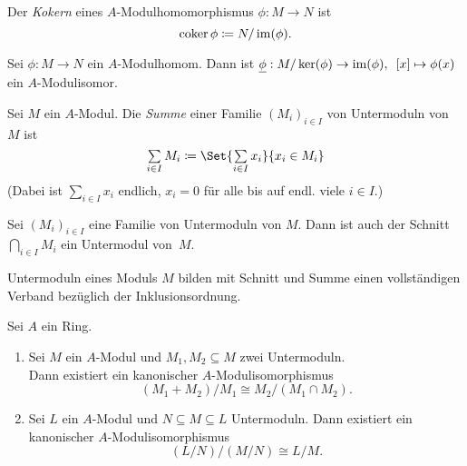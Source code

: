 \documentclass{cheat-sheet}
\DeclareMathOperator{\coker}{coker} %
\begin{document}
\begin{defn}
  Der \emph{Kokern} eines $A$-Modulhomomorphismus $\phi : M \to N$ ist
  \[
    \coker \phi \coloneqq N/\im(\phi).
  \]
\end{defn}


\begin{bem}
   \quad
  \inlineitem{$\phi$ surjektiv $\iff$ $\coker \phi = 0$}
\end{bem}

\begin{prop}
  Sei $\phi : M \to N$ ein $A$-Modulhomom.
  Dann ist $\underline{\phi} : M / \ker(\phi) \to \operatorname{im}(\phi), \enspace [x] \mapsto \phi(x)$ ein $A$-Modulisomor.
\end{prop}


\begin{defn}
  Sei $M$ ein $A$-Modul.
  Die \emph{Summe} einer Familie $(M_i)_{i \in I}$ von Untermoduln von $M$ ist
  \[
    \sum_{i \in I} M_i \coloneqq \Set{\sum_{i \in I} x_i}{x_i \in M_i}
  \]
  (Dabei ist $\sum_{i \in I} x_i$ endlich, \dh{} $x_i = 0$ für alle bis auf endl. viele $i \in I$.)
\end{defn}

\begin{prop}
  Sei $(M_i)_{i \in I}$ eine Familie von Untermoduln von $M$.
  Dann ist auch der Schnitt $\bigcap_{i \in I} M_i$ ein Untermodul von~$M$.
\end{prop}

\begin{bem}
  Untermoduln eines Moduls $M$ bilden mit Schnitt und Summe einen vollständigen Verband bezüglich der Inklusionsordnung.
\end{bem}


\begin{prop}
  Sei $A$ ein Ring.
  \begin{enumerate}
    \item Sei $M$ ein $A$-Modul und $M_1, M_2 \subseteq M$ zwei Untermoduln. \\
    Dann existiert ein kanonischer $A$-Modulisomorphismus
    \[
      (M_1 + M_2)/M_1 \cong M_2 / (M_1 \cap M_2).
    \]
    \item Sei $L$ ein $A$-Modul und $N \subseteq M \subseteq L$ Untermoduln.
    Dann existiert ein kanonischer $A$-Modulisomorphismus
    \[
      (L/N) / (M/N) \cong L/M.
    \]
  \end{enumerate}
\end{prop}
\end{document}
